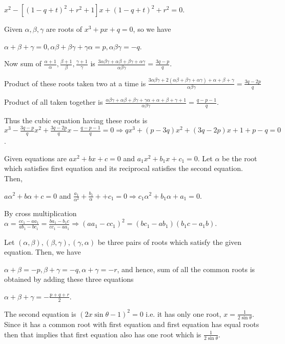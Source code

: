   $x^2 - [(1 - q + t)^2 + r^2 + 1]x + (1 - q + t)^2 + r^2 = 0$.
\item Given $\alpha, \beta, \gamma$ are roots of $x^3 + px + q = 0$, so we have

  $\alpha + \beta + \gamma = 0, \alpha\beta + \beta\gamma + \gamma\alpha = p, \alpha\beta\gamma = -q$.

  Now sum of $\frac{\alpha + 1}{\alpha}, \frac{\beta + 1}{\beta}, \frac{\gamma + 1}{\gamma}$ is
  $\frac{3\alpha\beta\gamma + \alpha\beta + \beta\gamma + \alpha\gamma}{\alpha\beta\gamma} = \frac{3q -
    p}{q}$.

  Product of these roots taken two at a time is $\frac{3\alpha\beta\gamma + 2(\alpha\beta + \beta\gamma +
    \alpha\gamma) + \alpha + \beta + \gamma}{\alpha\beta\gamma} = \frac{3q - 2p}{q}$

  Product of all taken together is $\frac{\alpha\beta\gamma + \alpha\beta + \beta\gamma + \gamma\alpha +
    \alpha + \beta + \gamma + 1}{\alpha\beta\gamma} = \frac{q - p - 1}{q}$.

  Thus the cubic equation having these roots is $x^3 - \frac{3q - p}{q}x^2 + \frac{3q - 2p}{q}x - \frac{q -
    p - 1}{q} = 0 \Rightarrow qx^3 + (p - 3q)x^2 + (3q - 2p)x + 1 + p - q = 0$.
\item Given equations are $ax^2 + bx + c = 0$ and $a_1x^2 + b_1x + c_1 = 0$. Let $\alpha$ be the root which
  satisfies first equation and its reciprocal satisfies the second equation. Then,

  $a\alpha^2 + b\alpha + c = 0$ and $\frac{a_1}{\alpha^2} + \frac{b_1}{\alpha} ++ c_1 = 0 \Rightarrow
  c_1\alpha^2 + b_1\alpha + a_1 = 0$.

  By cross multiplication $\alpha = \frac{cc_1 - aa_1}{ab_1 - bc_1} = \frac{ba_1 - b_1c}{cc_1 - aa_1}
  \Rightarrow (aa_1 - cc_1)^2 = (bc_1 - ab_1)(b_1c - a_1b)$.
\item Let $(\alpha, \beta), (\beta, \gamma), (\gamma, \alpha)$ be three pairs of roots which satisfy the
  given equation. Then, we have

  $\alpha + \beta = -p, \beta + \gamma = -q, \alpha + \gamma = -r$, and hence, sum of all the common roots is
  obtained by adding these three equations

  $\alpha + \beta + \gamma = -\frac{p + q + r}{2}$.
\item The second equation is $(2x\sin\theta - 1)^2 = 0$ i.e. it has only one root, $x =
  \frac{1}{2\sin\theta}$. Since it has a common root with first equation and first equation has equal roots
  then that implies that first equation also has one root which is $\frac{1}{2\sin\theta}$.

